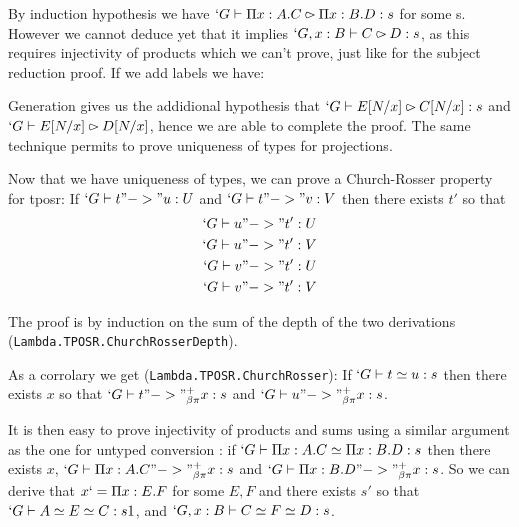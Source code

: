 \documentclass[11pt]{article}
\def\TPOSR{{\sc tposr}\xspace}
\def\coqmodule#1{\texttt{#1}}
\begin{document}
\begin{prooftree}
\end{prooftree}
\begin{prooftree}
\end{prooftree}

By induction hypothesis we have $`G \type \Pi x : A.C \sub \Pi x : B.D :
s$ for some s. However we cannot deduce yet that it implies $`G, x : B
\type C \sub D : s$, as this requires injectivity of products which we
can't prove, just like for the subject reduction proof. If we add labels
we have:

\begin{prooftree}
\end{prooftree}
\begin{prooftree}
\end{prooftree}

Generation gives us the addidional hypothesis that $`G \type E[N/x] \sub
C[N/x] : s$ and $`G \type E[N/x] \sub D[N/x]$, hence we are able to
complete the proof.
The same technique permits to prove uniqueness of types for projections.

Now that we have uniqueness of types, we can prove a Church-Rosser
property for \TPOSR:
If $`G \type t "->" u : U$ and $`G \type t "->" v : V$ then there exists
$t'$ so that
\begin{eqnarray*}
  `G \type u "->" t' : U \\
  `G \type u "->" t' : V \\
  `G \type v "->" t' : U \\
  `G \type v "->" t' : V
\end{eqnarray*}

The proof is by induction on the sum of the depth of the two derivations 
(\coqmodule{Lambda.TPOSR.\-ChurchRosserDepth}).

As a corrolary we get (\coqmodule{Lambda.TPOSR.ChurchRosser}):
If $`G \type t \simeq u : s$ then there exists $x$ so that $`G \type t
\redpbp x : s$ and $`G \type u \redpbp x : s$.

It is then easy to prove injectivity of products and sums using a
similar argument as the one for untyped conversion : if $`G \type \Pi x :
A. C \simeq \Pi x : B. D : s$ then there exists $x$, $`G \type \Pi x : A. C
\redpbp x : s$ and $`G \type \Pi x : B.D \redpbp x : s$. So we can
derive that $x `= \Pi x : E.F$ for some $E, F$ and there exists $s'$
so that $`G \type A \simeq E \simeq C : s1$, and $`G, x : B \type C
\simeq F \simeq D : s$.
\end{document}
